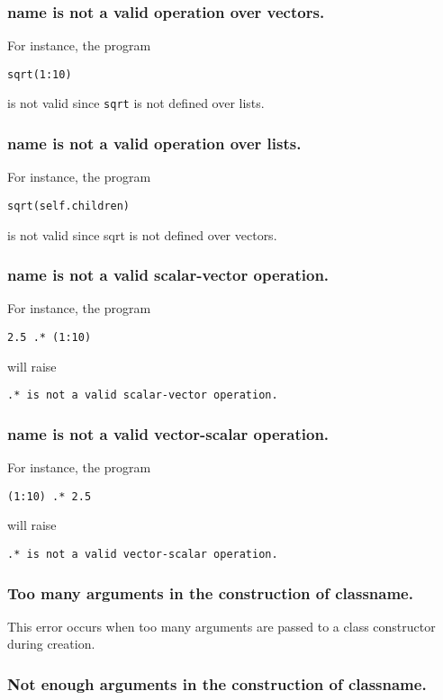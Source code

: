 \subsubsection{name is not a valid operation over vectors.}
%
For instance, the program
%
\begin{lstlisting}
sqrt(1:10)
\end{lstlisting}
%
is not valid since \lstinline{sqrt} is not defined over lists.
\subsubsection{name is not a valid operation over lists.}

For instance, the program
%
\begin{lstlisting}
sqrt(self.children)
\end{lstlisting}
%
is not valid since sqrt is not defined over vectors.
\subsubsection{name is not a valid scalar-vector operation.}

For instance, the program
%
\begin{lstlisting}
2.5 .* (1:10)
\end{lstlisting}
%
will raise
%
\begin{lstlisting}
.* is not a valid scalar-vector operation.
\end{lstlisting}

\subsubsection{name is not a valid vector-scalar operation.}

For instance, the program
%
\begin{lstlisting}
(1:10) .* 2.5
\end{lstlisting}
%
will raise
%
\begin{lstlisting}
.* is not a valid vector-scalar operation.
\end{lstlisting}

\subsubsection{Too many arguments in the construction of classname.}

This error occurs when too many arguments are passed to a class constructor during creation.
\subsubsection{Not enough arguments in the construction of classname.}


